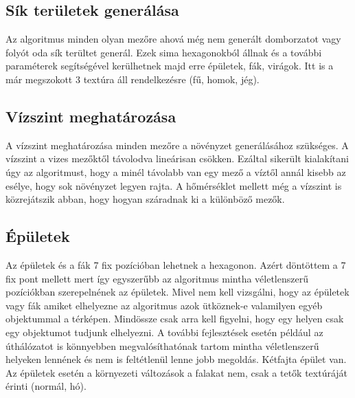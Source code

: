 \subsection{Sík területek generálása}

Az algoritmus minden olyan mezőre ahová még nem generált domborzatot vagy folyót oda sík terültet generál. Ezek sima hexagonokból állnak és a további paraméterek segítségével kerülhetnek majd erre épületek, fák, virágok. Itt is a már megszokott 3 textúra áll rendelkezésre (fű, homok, jég).

\subsection{Vízszint meghatározása}

A vízszint meghatározása minden mezőre a növényzet generálásához szükséges. A vízszint a vizes mezőktől távolodva lineárisan csökken. Ezáltal sikerült kialakítani úgy az algoritmust, hogy a minél távolabb van egy mező a víztől annál kisebb az esélye, hogy sok növényzet legyen rajta. A hőmérséklet mellett még a vízszint is közrejátszik abban, hogy hogyan száradnak ki a különböző mezők.

\subsection{Épületek}

Az épületek és a fák 7 fix pozícióban lehetnek a hexagonon. Azért döntöttem a 7 fix pont mellett mert így egyszerűbb az algoritmus mintha véletlenszerű pozíciókban szerepelnének az  épületek. Mivel nem kell vizsgálni, hogy az épületek vagy fák amiket elhelyezne az algoritmus azok ütköznek-e valamilyen egyéb objektummal a térképen. Mindössze csak arra kell figyelni, hogy egy helyen csak egy objektumot tudjunk elhelyezni. A további fejlesztések esetén például az úthálózatot is könnyebben megvalósíthatónak tartom mintha véletlenszerű helyeken lennének és nem is feltétlenül lenne jobb megoldás. Kétfajta épület van. Az épületek esetén a környezeti változások a falakat nem, csak a tetők textúráját érinti (normál, hó).


